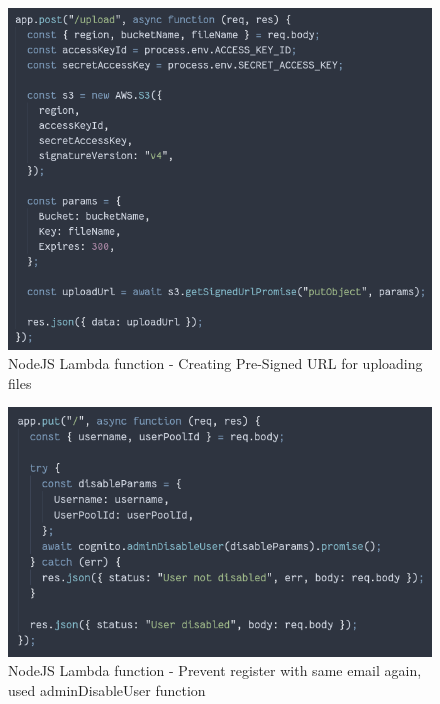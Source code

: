 \begin{figure}[!hb]
\centering
\caption[Creating Pre-Signed URL for uploading files]{NodeJS Lambda function - Creating Pre-Signed URL for uploading files}%
\label{fig:s3_signed_url}
\includegraphics[width=\linewidth,height=\textheight,keepaspectratio]{img/s3_signed_url}
\end{figure} 

\begin{figure}[!hb]
\centering
\caption[Prevent register with same email again, used adminDisableUser function]{NodeJS Lambda function - Prevent register with same email again, used adminDisableUser function}%
\label{fig:delete_user}
\includegraphics[width=\linewidth,height=\textheight,keepaspectratio]{img/delete_user}
\end{figure} 

